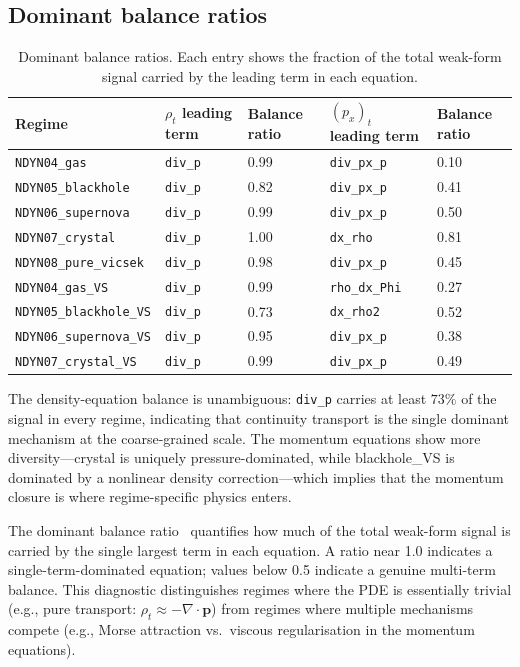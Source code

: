 \subsection{Dominant balance ratios}

\begin{table}[ht]
\centering
\caption{Dominant balance ratios.  Each entry shows the fraction
of the total weak-form signal carried by the leading term in each equation.}
\label{tab:wsindy_dominant_balance}
\renewcommand{\arraystretch}{0.95}
\small
\begin{tabular}{lllll}
\toprule
\textbf{Regime} & $\rho_t$ leading term & Balance ratio & $(p_x)_t$ leading term & Balance ratio \\
\midrule
\texttt{NDYN04\_gas} & \texttt{div\_p} & 0.99 & \texttt{div\_px\_p} & 0.10 \\
\texttt{NDYN05\_blackhole} & \texttt{div\_p} & 0.82 & \texttt{div\_px\_p} & 0.41 \\
\texttt{NDYN06\_supernova} & \texttt{div\_p} & 0.99 & \texttt{div\_px\_p} & 0.50 \\
\texttt{NDYN07\_crystal} & \texttt{div\_p} & 1.00 & \texttt{dx\_rho} & 0.81 \\
\texttt{NDYN08\_pure\_vicsek} & \texttt{div\_p} & 0.98 & \texttt{div\_px\_p} & 0.45 \\
\midrule
\texttt{NDYN04\_gas\_VS} & \texttt{div\_p} & 0.99 & \texttt{rho\_dx\_Phi} & 0.27 \\
\texttt{NDYN05\_blackhole\_VS} & \texttt{div\_p} & 0.73 & \texttt{dx\_rho2} & 0.52 \\
\texttt{NDYN06\_supernova\_VS} & \texttt{div\_p} & 0.95 & \texttt{div\_px\_p} & 0.38 \\
\texttt{NDYN07\_crystal\_VS} & \texttt{div\_p} & 0.99 & \texttt{div\_px\_p} & 0.49 \\
\bottomrule
\end{tabular}
\end{table}

\noindent
The density-equation balance is unambiguous: \texttt{div\_p} carries at
least $73\%$ of the signal in every regime, indicating that continuity
transport is the single dominant mechanism at the coarse-grained scale.
The momentum equations show more diversity---crystal is uniquely
pressure-dominated, while blackhole\_VS is dominated by a nonlinear
density correction---which implies that the momentum closure is where
regime-specific physics enters.

The dominant balance ratio~\cite{callaham2021dominant} quantifies how much of
the total weak-form signal is carried by the single largest term in each
equation.  A ratio near 1.0 indicates a single-term-dominated equation; values
below 0.5 indicate a genuine multi-term balance.  This diagnostic distinguishes
regimes where the PDE is essentially trivial (e.g., pure transport:
$\rho_t \approx -\nabla\cdot\mathbf{p}$) from regimes where multiple
mechanisms compete (e.g., Morse attraction vs.\ viscous regularisation in the
momentum equations).

